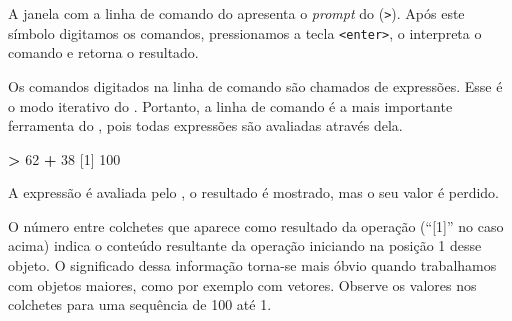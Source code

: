 \documentclass[]{book}
\newenvironment{Shaded}{\begin{snugshade}}{\end{snugshade}}
\newcommand{\DecValTok}[1]{\textcolor[rgb]{0.00,0.00,0.81}{#1}}
\newcommand{\StringTok}[1]{\textcolor[rgb]{0.31,0.60,0.02}{#1}}
\newcommand{\OperatorTok}[1]{\textcolor[rgb]{0.81,0.36,0.00}{\textbf{#1}}}
\newcommand{\NormalTok}[1]{#1}
\begin{document}
A janela com a linha de comando do apresenta o \emph{prompt} do
(\texttt{\textgreater{}}). Após este símbolo digitamos os comandos,
pressionamos a tecla \texttt{\textless{}enter\textgreater{}}, o
interpreta o comando e retorna o resultado.

Os comandos digitados na linha de comando são chamados de expressões.
Esse é o modo iterativo do . Portanto, a linha de comando é a mais
importante ferramenta do , pois todas expressões são avaliadas através
dela.

\begin{Shaded}
\begin{Highlighting}[]
\OperatorTok{>}\StringTok{ }\DecValTok{62} \OperatorTok{+}\StringTok{ }\DecValTok{38}
\NormalTok{[}\DecValTok{1}\NormalTok{] }\DecValTok{100}
\end{Highlighting}
\end{Shaded}

A expressão é avaliada pelo , o resultado é mostrado, mas o seu valor é
perdido.

O número entre colchetes que aparece como resultado da operação
(``{[}1{]}'' no caso acima) indica o conteúdo resultante da operação
iniciando na posição 1 desse objeto. O significado dessa informação
torna-se mais óbvio quando trabalhamos com objetos maiores, como por
exemplo com vetores. Observe os valores nos colchetes para uma sequência
de 100 até 1.
\end{document}
